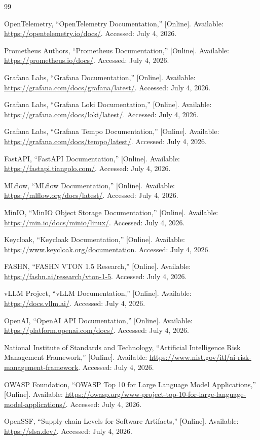 \documentclass[12pt,a4paper,oneside]{report}
\begin{document}
{}
\begin{thebibliography}{99}

OpenTelemetry, ``OpenTelemetry Documentation,'' [Online]. Available:
\url{https://opentelemetry.io/docs/}. Accessed: July 4, 2026.

Prometheus Authors, ``Prometheus Documentation,'' [Online]. Available:
\url{https://prometheus.io/docs/}. Accessed: July 4, 2026.

Grafana Labs, ``Grafana Documentation,'' [Online]. Available:
\url{https://grafana.com/docs/grafana/latest/}. Accessed: July 4, 2026.

Grafana Labs, ``Grafana Loki Documentation,'' [Online]. Available:
\url{https://grafana.com/docs/loki/latest/}. Accessed: July 4, 2026.

Grafana Labs, ``Grafana Tempo Documentation,'' [Online]. Available:
\url{https://grafana.com/docs/tempo/latest/}. Accessed: July 4, 2026.

FastAPI, ``FastAPI Documentation,'' [Online]. Available:
\url{https://fastapi.tiangolo.com/}. Accessed: July 4, 2026.

MLflow, ``MLflow Documentation,'' [Online]. Available:
\url{https://mlflow.org/docs/latest/}. Accessed: July 4, 2026.

MinIO, ``MinIO Object Storage Documentation,'' [Online]. Available:
\url{https://min.io/docs/minio/linux/}. Accessed: July 4, 2026.

Keycloak, ``Keycloak Documentation,'' [Online]. Available:
\url{https://www.keycloak.org/documentation}. Accessed: July 4, 2026.

FASHN, ``FASHN VTON 1.5 Research,'' [Online]. Available:
\url{https://fashn.ai/research/vton-1-5}. Accessed: July 4, 2026.

vLLM Project, ``vLLM Documentation,'' [Online]. Available:
\url{https://docs.vllm.ai/}. Accessed: July 4, 2026.

OpenAI, ``OpenAI API Documentation,'' [Online]. Available:
\url{https://platform.openai.com/docs/}. Accessed: July 4, 2026.

National Institute of Standards and Technology, ``Artificial Intelligence Risk
Management Framework,'' [Online]. Available:
\url{https://www.nist.gov/itl/ai-risk-management-framework}. Accessed:
July 4, 2026.

OWASP Foundation, ``OWASP Top 10 for Large Language Model Applications,''
[Online]. Available:
\url{https://owasp.org/www-project-top-10-for-large-language-model-applications/}.
Accessed: July 4, 2026.

OpenSSF, ``Supply-chain Levels for Software Artifacts,'' [Online]. Available:
\url{https://slsa.dev/}. Accessed: July 4, 2026.

\end{thebibliography}
\end{document}
